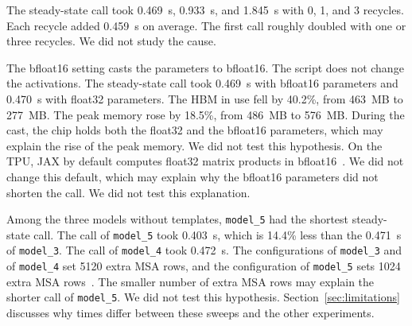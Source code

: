 The steady-state call took 0.469~s, 0.933~s, and 1.845~s with 0, 1, and 3 recycles. Each recycle added 0.459~s on average. %
The first call roughly doubled with one or three recycles. We did not study the cause.

The bfloat16 setting casts the parameters to bfloat16. The script does not change the activations.
The steady-state call took 0.469~s with bfloat16 parameters and 0.470~s with float32 parameters. %
The HBM in use fell by 40.2\%, from 463~MB to 277~MB. %
The peak memory rose by 18.5\%, from 486~MB to 576~MB. %
During the cast, the chip holds both the float32 and the bfloat16 parameters, which may explain the rise of the peak memory.
 We did not
test this hypothesis. On the TPU, JAX by default computes float32 matrix products in
bfloat16~\cite{jaxmatmulprecision}. We did not change this default, which may explain why the bfloat16 parameters did
not shorten the call. We did not test this explanation.

Among the three models without templates, \texttt{model\_5} had the shortest steady-state call.
The call of \texttt{model\_5} took 0.403~s, which is 14.4\% less than the 0.471~s of \texttt{model\_3}. The call of \texttt{model\_4} took 0.472~s. %
The configurations of \texttt{model\_3} and of \texttt{model\_4} set 5120 extra MSA rows, and the configuration of \texttt{model\_5} sets 1024 extra MSA rows~\cite{alphafoldrepo}. %
The smaller number of extra MSA rows may explain the shorter call of \texttt{model\_5}. We did not test this hypothesis.
Section~\ref{sec:limitations} discusses why times differ between these sweeps and the other experiments.

